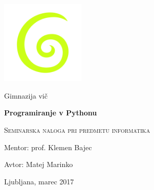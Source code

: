 \documentclass[a4paper, 12pt]{article}
\begin{document}
    \begin{titlepage}
    	\centering
    	\includegraphics[width=0.3\textwidth]{gimvic_logo.png}\par
    	{\Large Gimnazija vič \par}
    	\vspace{1cm}
        {\huge\bfseries Programiranje v Pythonu\par}
    	\vspace{0.5cm}
        {\scshape\Large Seminarska naloga pri predmetu informatika\par}
    	\vspace{2cm}
        {\Large Mentor: prof. Klemen Bajec\par}
    	{\Large Avtor: Matej Marinko\par}
    	\vfill

    	{\large Ljubljana, marec 2017\par}
    \end{titlepage}


    \thispagestyle{empty}
    \newpage

    \begin{abstract}
    \noindent Namen naloge je izdelati program za steganografijo digitalnih fotografij. V prvem delu seminarske naloge je razloženo, kaj je steganografija in predstavljeni so njeni primeri skozi čas. V nadaljevanju je še ostala teorija, ki je pomembna za razumevanje in izdelavo programa. To so osnove zapisa sliku v računalniku, osnove simetrične enkripcije in nekaj o programskem jeziku Python. Sledi praktični del naloge. Ker je celoten program razmeroma obsežen ter zato ni primerno, da bi bil natančno predstavljen v celoti, so podrobneje razloženi samo nekateri njegovi pomembnejši deli. Namen seminarske naloge je bil dosežen, saj je bil napisan program za steganografijo slik, ki zadovoljivo deluje.
    \\

    \noindent \textbf{Ključne besede:} steganografija, kriptografija, programski jezik Python
    \end{abstract}


    \newpage
\end{document}
